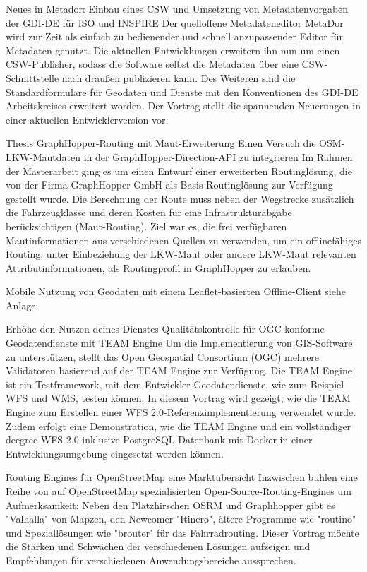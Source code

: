 %
{Neues in Metador: Einbau eines CSW und Umsetzung von Metadatenvorgaben der GDI-DE für ISO und INSPIRE}%
{}%
{Der quelloffene Metadateneditor MetaDor wird zur Zeit als einfach zu bedienender und schnell
anzupassender Editor für Metadaten genutzt. Die aktuellen Entwicklungen erweitern ihn nun um einen
CSW-Publisher, sodass die Software selbst die Metadaten über eine CSW-Schnittstelle nach draußen
publizieren kann. Des Weiteren sind die Standardformulare für Geodaten und Dienste mit den
Konventionen des GDI-DE Arbeitskreises erweitert worden. Der Vortrag stellt die spannenden
Neuerungen in einer aktuellen Entwicklerversion vor.}

%
{Thesis GraphHopper-Routing mit Maut-Erweiterung}%
{Einen Versuch die OSM-LKW-Mautdaten in der GraphHopper-Direction-API zu integrieren}%
{Im Rahmen der Masterarbeit ging es um einen Entwurf einer erweiterten
Routinglösung, die von der Firma GraphHopper GmbH als
Basis-Routinglösung zur Verfügung gestellt wurde. Die Berechnung der
Route muss neben der Wegstrecke zusätzlich die Fahrzeugklasse und deren
Kosten für eine Infrastrukturabgabe berücksichtigen (Maut-Routing).
Ziel war es, die frei verfügbaren Mautinformationen aus verschiedenen
Quellen zu verwenden, um ein offlinefähiges Routing, unter Einbeziehung
der LKW-Maut oder andere LKW-Maut relevanten Attributinformationen, als
Routingprofil in GraphHopper zu erlauben.}

%
{Mobile Nutzung von Geodaten mit einem Leaflet-basierten Offline-Client }%
{}%
{siehe Anlage}

%
{Erhöhe den Nutzen deines Dienstes}%
{Qualitätskontrolle für OGC-konforme Geodatendienste mit TEAM Engine}%
{Um die Implementierung von GIS-Software zu unterstützen, stellt das Open Geospatial Consortium
(OGC) mehrere Validatoren basierend auf der TEAM Engine zur Verfügung. Die TEAM Engine ist ein
Testframework, mit dem Entwickler Geodatendienste, wie zum Beispiel WFS und WMS, testen können.  In
diesem Vortrag wird gezeigt, wie die TEAM Engine zum Erstellen einer WFS 2.0-Referenzimplementierung
verwendet wurde. Zudem erfolgt eine Demonstration, wie die TEAM Engine und ein vollständiger deegree
WFS 2.0 inklusive PostgreSQL Datenbank mit Docker in einer Entwicklungsumgebung eingesetzt werden
können.}

%
{Routing Engines für OpenStreetMap}%
{eine Marktübersicht}%
{Inzwischen buhlen eine Reihe von auf OpenStreetMap spezialisierten Open-Source-Routing-Engines um
Aufmerksamkeit: Neben den Platzhirschen OSRM und Graphhopper gibt es "Valhalla" von Mapzen, den
Newcomer "Itinero", ältere Programme wie "routino" und Speziallösungen wie "brouter" für das
Fahrradrouting. Dieser Vortrag möchte die Stärken und Schwächen der verschiedenen Lösungen aufzeigen
und Empfehlungen für verschiedenen Anwendungsbereiche aussprechen. }


